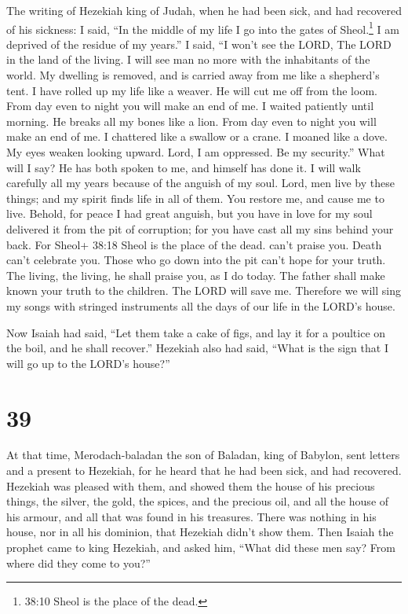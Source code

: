  The writing of Hezekiah king of Judah, when he had been
sick, and had recovered of his sickness:  I said, ``In the
middle of my life I go into the gates of Sheol.\footnote{38:10 Sheol is
  the place of the dead.} I am deprived of the residue of my years.''
 I said, ``I won't see the LORD, The LORD in the land of
the living. I will see man no more with the inhabitants of the world.
 My dwelling is removed, and is carried away from me like a
shepherd's tent. I have rolled up my life like a weaver. He will cut me
off from the loom. From day even to night you will make an end of me.
 I waited patiently until morning. He breaks all my bones
like a lion. From day even to night you will make an end of me.
 I chattered like a swallow or a crane. I moaned like a
dove. My eyes weaken looking upward. Lord, I am oppressed. Be my
security.''  What will I say? He has both spoken to me, and
himself has done it. I will walk carefully all my years because of the
anguish of my soul.  Lord, men live by these things; and my
spirit finds life in all of them. You restore me, and cause me to live.
 Behold, for peace I had great anguish, but you have in
love for my soul delivered it from the pit of corruption; for you have
cast all my sins behind your back.  For Sheol+ 38:18 Sheol
is the place of the dead. can't praise you. Death can't celebrate you.
Those who go down into the pit can't hope for your truth. 
The living, the living, he shall praise you, as I do today. The father
shall make known your truth to the children.  The LORD will
save me. Therefore we will sing my songs with stringed instruments all
the days of our life in the LORD's house.

 Now Isaiah had said, ``Let them take a cake of figs, and
lay it for a poultice on the boil, and he shall recover.'' 
Hezekiah also had said, ``What is the sign that I will go up to the
LORD's house?''

\hypertarget{section-37}{%
\section{39}\label{section-37}}

 At that time, Merodach-baladan the son of Baladan, king of
Babylon, sent letters and a present to Hezekiah, for he heard that he
had been sick, and had recovered.  Hezekiah was pleased with
them, and showed them the house of his precious things, the silver, the
gold, the spices, and the precious oil, and all the house of his armour,
and all that was found in his treasures. There was nothing in his house,
nor in all his dominion, that Hezekiah didn't show them. 
Then Isaiah the prophet came to king Hezekiah, and asked him, ``What did
these men say? From where did they come to you?''

